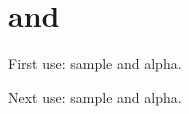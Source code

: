 \documentclass[12pt]{article}
\begin{document}
\tableofcontents
\section{ and } 

First use: \gls{sample} and \gls{alpha}. 

Next use: \gls{sample} and \gls{alpha}. 

\printunsrtglossary 
\end{document}
